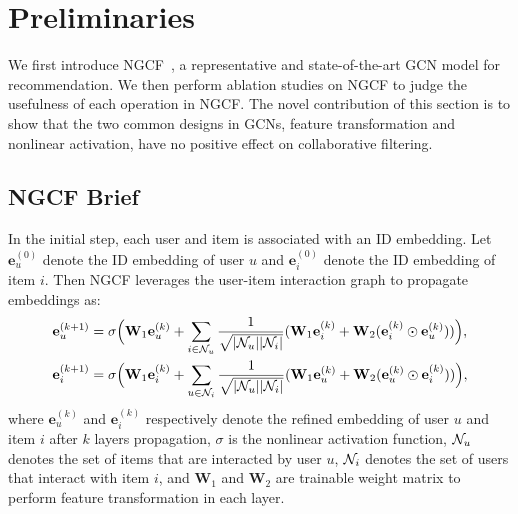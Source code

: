 \section{Preliminaries}\label{sec:preliminaries}

We first introduce NGCF~\cite{NGCF}, a representative and state-of-the-art GCN model for recommendation. We then perform ablation studies on NGCF to judge the usefulness of each operation in NGCF. The novel contribution of this section is to show that the two common designs in GCNs, feature transformation and nonlinear activation, have no positive effect on collaborative filtering. 

\subsection{NGCF Brief}\label{ss:ngcf}
In the initial step, each user and item is associated with an ID embedding. Let $\textbf{e}_u^{(0)}$ denote the ID embedding of user $u$ and $\textbf{e}_i^{(0)}$ denote the ID embedding of item $i$. Then NGCF leverages the user-item interaction graph to propagate embeddings as:
\begin{equation}\label{eq:NGCF}
\begin{aligned}
    \textbf{e}_{u}^{(k+1)} &= \sigma \Big(\textbf{W}_1 \textbf{e}_u^{(k)} + \sum_{i\in \mathcal{N}_u} \frac{1}{\sqrt{|\mathcal{N}_{u}||\mathcal{N}_{i}|}}(\mathbf{W}_{1}\mathbf{e}_{i}^{(k)} + \mathbf{W}_{2}(\mathbf{e}_{i}^{(k)}\odot\mathbf{e}_{u}^{(k)}))\Big), \\
    \textbf{e}_{i}^{(k+1)} &= \sigma \Big(\textbf{W}_1 \textbf{e}_i^{(k)} + \sum_{u\in \mathcal{N}_i} \frac{1}{\sqrt{|\mathcal{N}_{u}||\mathcal{N}_{i}|}}(\mathbf{W}_{1}\mathbf{e}_{u}^{(k)} + \mathbf{W}_{2}(\mathbf{e}_{u}^{(k)}\odot\mathbf{e}_{i}^{(k)}))\Big),
\end{aligned}
\end{equation}
where $\textbf{e}_{u}^{(k)}$ and $\textbf{e}_{i}^{(k)}$ respectively denote the refined embedding of user $u$ and item $i$ after $k$ layers propagation, $\sigma$ is the nonlinear activation function,
$\mathcal{N}_{u}$ denotes the set of items that are interacted by user $u$, $\mathcal{N}_{i}$ denotes the set of users that interact with item $i$, and $\textbf{W}_1$ and $\textbf{W}_2$ are trainable weight matrix to perform feature transformation in each layer. 
